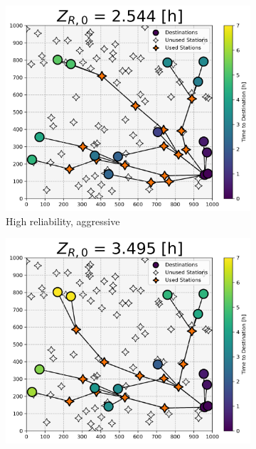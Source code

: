 \documentclass[11pt]{article}
\begin{document}
\begin{multicols}{2}
\begin{figure}[H]
	\centering
	\begin{subfigure}[t]{.5\linewidth}
		\centering\captionsetup{width = .8\linewidth}
		\includegraphics[width = \linewidth]{figs/random_example_high_reliability_aggressive_perceived.png}
		\caption{High reliability, aggressive}
	\end{subfigure}%
	\begin{subfigure}[t]{.5\linewidth}
		\centering\captionsetup{width = .8\linewidth}
		\includegraphics[width = \linewidth]{figs/random_example_high_reliability_cautious_perceived.png}

\end{subfigure}
\end{figure}
\end{multicols}
\end{document}
